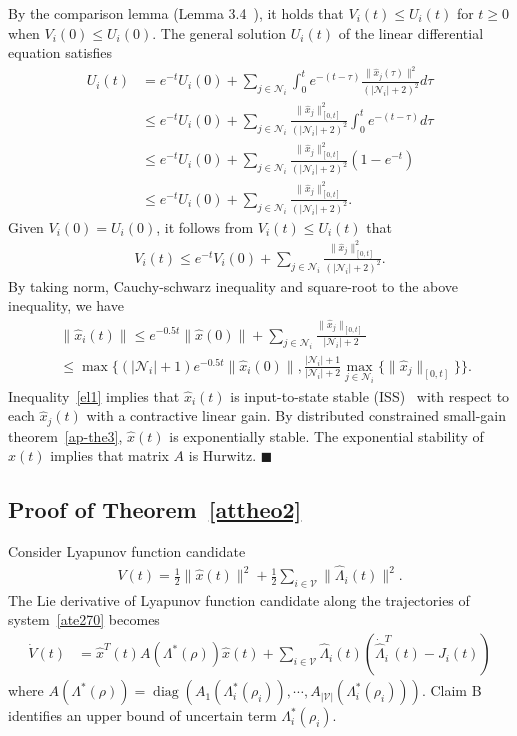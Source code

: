 \documentclass[journal]{IEEEtran}
\newcommand{\nnum}{\nonumber}
\newcommand{\NN}{{\mathcal{N}}}
\newcommand{\VV}{{\mathcal{V}}}
\newcommand{\diag}[1]{\operatorname{diag}(#1)}
\newcommand\oprocendsymbol{\hbox{$\blacksquare$}}
\newcommand\oprocend{\relax\ifmmode\else\unskip\hfill\fi\oprocendsymbol}
\begin{document}
By the comparison lemma (Lemma 3.4~\cite{Khalil:02}), it holds that $V_i(t) \leq U_i(t)$
for $t\geq 0$ when $V_i(0)\leq U_i(0)$.
The general solution $U_i(t)$ of the linear differential equation satisfies
\begin{align*}
U_i(t) &= e^{-t} U_i(0)+ \sum_{j \in {{\NN}}_i}\int_{0}^t e^{-(t-\tau)} \frac{\|\hat{x}_j(\tau)\|^2}{(|{{\NN}}_i|+2)^2} d\tau\nnum\\
&\leq  e^{-t} U_i(0)+ \sum_{j \in {{\NN}}_i}\frac{\|\hat{x}_j\|_{[0,t]}^2}{(|{{\NN}}_i|+2)^2} \int_{0}^t e^{-(t-\tau)} d\tau \nnum\\
&\leq e^{-t} U_i(0) + \sum_{j \in {{\NN}}_i} \frac{\|\hat{x}_j\|_{[0,t]}^2}{(|{{\NN}}_i|+2)^2}(1-e^{-t}) \nnum\\
&\leq e^{-t} U_i(0) + \sum_{j \in {{\NN}}_i} \frac{\|\hat{x}_j\|_{[0,t]}^2}{(|{{\NN}}_i|+2)^2}.
\end{align*}
Given $V_i(0) =U_i(0)$, it follows from $V_i(t) \leq U_i(t)$ that
\begin{align*}
V_i(t) \leq e^{- t} V_i(0) + \sum_{j \in {{\NN}}_i} \frac{\|\hat{x}_j\|_{[0,t]}^2}{(|{{\NN}}_i|+2)^2}.
\end{align*}
By taking norm, Cauchy-schwarz inequality and square-root to the above inequality, we have
\begin{align}
&\|\hat{x}_i(t)\| \leq e^{-0.5 t} \|\hat{x}(0)\| + \sum_{j \in {{\NN}}_i} \frac{\|\hat{x}_j\|_{[0,t]}}{|{{\NN}}_i|+2}\nnum\\
&\leq \max \{ (|{{\NN}}_i|+1) e^{-0.5t} \| \hat{x}_{i}(0)\|, \frac{|{{\NN}}_i|+1}{|{{\NN}}_i|+2}\max_{j \in  {{\NN}}_i }\{\|\hat{x}_{j}\|_{[0,t]}\}\}.
\label{el1}
\end{align}
Inequality~\eqref{el1} implies that $\hat{x}_i(t)$ is input-to-state stable (ISS)~\cite{sontag1989smooth} with respect to each $\hat{x}_j(t)$ with a contractive linear gain.
By distributed constrained small-gain theorem~\ref{ap-the3}, $\hat{x}(t)$ is exponentially stable.
The exponential stability of $\hat{x}(t)$ implies that matrix $A$ is Hurwitz.
\oprocend

\subsection{Proof of Theorem~\ref{attheo2}}
Consider Lyapunov function candidate
\begin{align*} 
V(t)=\frac{1}{2} \|\hat{x}(t)\|^2+\frac{1}{2}\sum_{i \in {\VV}}\|\hat{\Lambda}_{i}(t)\|^2.
\end{align*}
The Lie derivative of Lyapunov function candidate along the trajectories of system~\eqref{ate270} becomes
\begin{align} 
\dot{V}(t)&=\hat{x}^T(t)A(\Lambda^*(\rho))\hat{x}(t)+\sum_{i \in {\VV}}\hat{\Lambda}_{i}(t)(\dot{\hat{\Lambda}}_{i}^T(t)-J_{i}(t))
\label{ate20}
\end{align}
where $A(\Lambda^*(\rho)) = \diag{A_1(\Lambda_i^*(\rho_i)), \cdots,A_{|{\VV}|}(\Lambda_i^*(\rho_i))}$.
Claim B identifies an upper bound of uncertain term $\Lambda_i^*(\rho_i)$.
\end{document}
